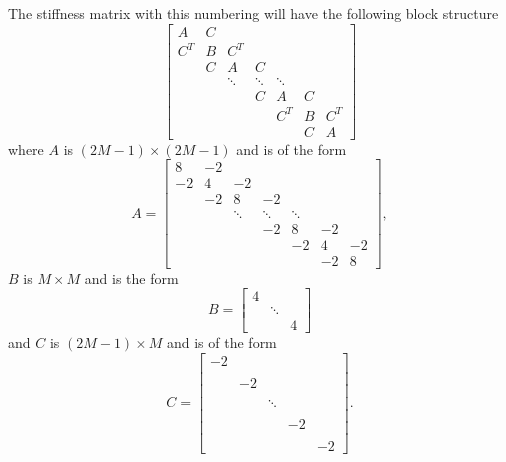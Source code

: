 \documentclass[11pt, titlepage]{article}
\begin{document}
\begin{enumerate}
\begin{enumerate}
        The stiffness matrix with this numbering will have the following block
        structure
        \[
          \begin{bmatrix}
              A & C &        &        &        &   &   \\
            C^T & B &    C^T &        &        &   &   \\
                & C &      A &      C &        &   &   \\
                &   & \ddots & \ddots & \ddots &   &   \\
                &   &        & C      &      A & C &   \\
                &   &        &        &    C^T & B & C^T \\
                &   &        &        &        & C & A
          \end{bmatrix}
        \]
        where $A$ is $(2M-1) \times (2M-1)$ and is of the form
        \[
          A =
          \begin{bmatrix}
             8 & -2 &        &        &        &    &   \\
            -2 &  4 &     -2 &        &        &    &   \\
               & -2 &      8 &     -2 &        &    &   \\
               &    & \ddots & \ddots & \ddots &    &   \\
               &    &        & -2     &      8 & -2 &   \\
               &    &        &        &    -2  &  4 & -2 \\
               &    &        &        &        & -2 & 8
          \end{bmatrix},
        \]
        $B$ is $M \times M$ and is the form
        \[
          B =
          \begin{bmatrix}
            4 &        & \\
              & \ddots & \\
              &        & 4
          \end{bmatrix}
        \]
        and $C$ is $(2M - 1) \times M$ and is of the form
        \[
          C =
          \begin{bmatrix}
            -2 &    &        &    &    \\
               &    &        &    &    \\
               & -2 &        &    &    \\
               &    &        &    &    \\
               &    & \ddots &    &    \\
               &    &        &    &    \\
               &    &        & -2 &    \\
               &    &        &    &    \\
               &    &        &    & -2
          \end{bmatrix}.
        \]


\end{enumerate}
\end{enumerate}
\end{document}
